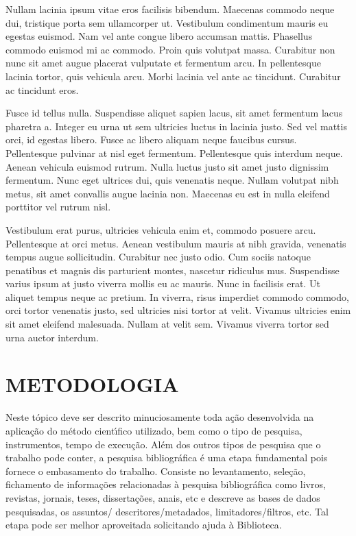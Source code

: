 Nullam lacinia ipsum vitae eros facilisis bibendum. Maecenas commodo neque dui, tristique porta sem ullamcorper ut. Vestibulum condimentum mauris eu egestas euismod. Nam vel ante congue libero accumsan mattis. Phasellus commodo euismod mi ac commodo. Proin quis volutpat massa. Curabitur non nunc sit amet augue placerat vulputate et fermentum arcu. In pellentesque lacinia tortor, quis vehicula arcu. Morbi lacinia vel ante ac tincidunt. Curabitur ac tincidunt eros.

Fusce id tellus nulla. Suspendisse aliquet sapien lacus, sit amet fermentum lacus pharetra a. Integer eu urna ut sem ultricies luctus in lacinia justo. Sed vel mattis orci, id egestas libero. Fusce ac libero aliquam neque faucibus cursus. Pellentesque pulvinar at nisl eget fermentum. Pellentesque quis interdum neque. Aenean vehicula euismod rutrum. Nulla luctus justo sit amet justo dignissim fermentum. Nunc eget ultrices dui, quis venenatis neque. Nullam volutpat nibh metus, sit amet convallis augue lacinia non. Maecenas eu est in nulla eleifend porttitor vel rutrum nisl.

Vestibulum erat purus, ultricies vehicula enim et, commodo posuere arcu. Pellentesque at orci metus. Aenean vestibulum mauris at nibh gravida, venenatis tempus augue sollicitudin. Curabitur nec justo odio. Cum sociis natoque penatibus et magnis dis parturient montes, nascetur ridiculus mus. Suspendisse varius ipsum at justo viverra mollis eu ac mauris. Nunc in facilisis erat. Ut aliquet tempus neque ac pretium. In viverra, risus imperdiet commodo commodo, orci tortor venenatis justo, sed ultricies nisi tortor at velit. Vivamus ultricies enim sit amet eleifend malesuada. Nullam at velit sem. Vivamus viverra tortor sed urna auctor interdum.

%

\chapter{METODOLOGIA}
\label{cap:cap02}

Neste t\'{o}pico deve ser descrito minuciosamente toda a\c{c}\~{a}o desenvolvida na aplica\c{c}\~{a}o do m\'{e}todo cient\'{\i}fico utilizado, bem como o tipo de pesquisa, instrumentos, tempo de execu\c{c}\~{a}o.
Al\'{e}m dos outros tipos de pesquisa que o trabalho pode conter, a pesquisa bibliogr\'{a}fica \'{e} uma etapa fundamental pois fornece o embasamento do trabalho. Consiste no levantamento, sele\c{c}\~{a}o, fichamento de informa\c{c}\~{o}es relacionadas \`{a} pesquisa bibliogr\'{a}fica como livros, revistas, jornais, teses, disserta\c{c}\~{o}es, anais, etc e descreve as bases de dados pesquisadas, os assuntos/ descritores/metadados, limitadores/filtros, etc. Tal etapa pode ser melhor aproveitada solicitando ajuda \`{a} Biblioteca.
\cite{Cover2006,Feynman1998,Haykin2001}

